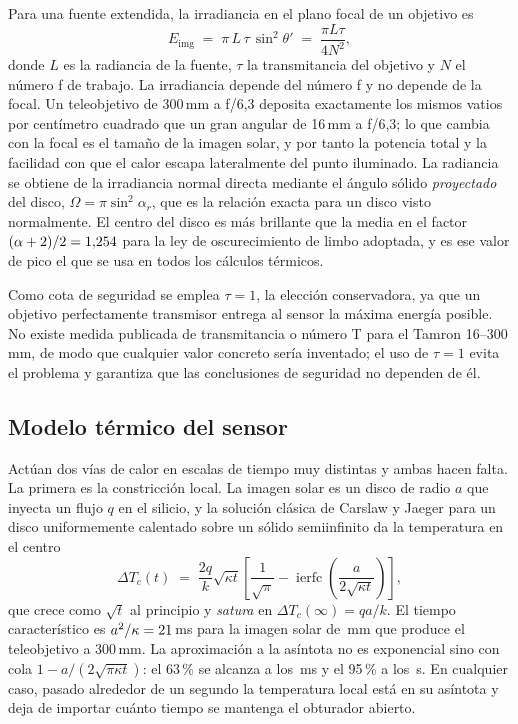 \documentclass[10pt,a4paper]{article}
\begin{document}
Para una fuente extendida, la irradiancia en el plano focal de un objetivo es
\begin{equation}
E_{\mathrm{img}} \;=\; \pi\,L\,\tau\,\sin^{2}\theta' \;=\; \frac{\pi L \tau}{4N^{2}},
\label{eq:focal}
\end{equation}
donde $L$ es la radiancia de la fuente, $\tau$ la transmitancia del objetivo y
$N$ el número f de trabajo. La irradiancia depende del número f y no depende de
la focal. Un teleobjetivo de 300\,mm a f/6,3 deposita exactamente los mismos
vatios por centímetro cuadrado que un gran angular de 16\,mm a f/6,3; lo que
cambia con la focal es el tamaño de la imagen solar, y por tanto la potencia
total y la facilidad con que el calor escapa lateralmente del punto iluminado.
La radiancia se obtiene de la irradiancia normal directa mediante el ángulo
sólido \emph{proyectado} del disco, $\Omega = \pi\sin^{2}\alpha_r$, que es la
relación exacta para un disco visto normalmente. El centro del disco es más
brillante que la media en el factor $(\alpha+2)/2 = 1{,}254$ para la ley de
oscurecimiento de limbo adoptada, y es ese valor de pico el que se usa en todos
los cálculos térmicos.

Como cota de seguridad se emplea $\tau = 1$, la elección conservadora, ya que un
objetivo perfectamente transmisor entrega al sensor la máxima energía posible.
No existe medida publicada de transmitancia o número T para el Tamron
16--300\,mm, de modo que cualquier valor concreto sería inventado; el uso de
$\tau=1$ evita el problema y garantiza que las conclusiones de seguridad no
dependen de él.

\subsection{Modelo térmico del sensor}

Actúan dos vías de calor en escalas de tiempo muy distintas y ambas hacen falta.
La primera es la constricción local. La imagen solar es un disco de radio $a$
que inyecta un flujo $q$ en el silicio, y la solución clásica de Carslaw y
Jaeger \cite{carslawjaeger} para un disco uniformemente calentado sobre un
sólido semiinfinito da la temperatura en el centro
\begin{equation}
\Delta T_c(t) \;=\; \frac{2q}{k}\sqrt{\kappa t}
\left[\frac{1}{\sqrt{\pi}} - \operatorname{ierfc}\!\left(\frac{a}{2\sqrt{\kappa t}}\right)\right],
\label{eq:cj}
\end{equation}
que crece como $\sqrt{t}$ al principio y \emph{satura} en
$\Delta T_c(\infty) = qa/k$. El tiempo característico es
$a^{2}/\kappa = 21$\,ms para la imagen solar de
\imgDiaThreeZeroZero\,mm que produce el teleobjetivo a 300\,mm. La aproximación
a la asíntota no es exponencial sino con cola $1-a/(2\sqrt{\pi\kappa t})$: el
63\,\% se alcanza a los \tauSpotThreeZeroZero\,ms y el 95\,\% a los
\tauNinetyFiveThreeZeroZero\,s. En cualquier caso, pasado alrededor de un
segundo la temperatura local está en su asíntota y deja de importar cuánto tiempo
se mantenga el obturador abierto.
\end{document}
